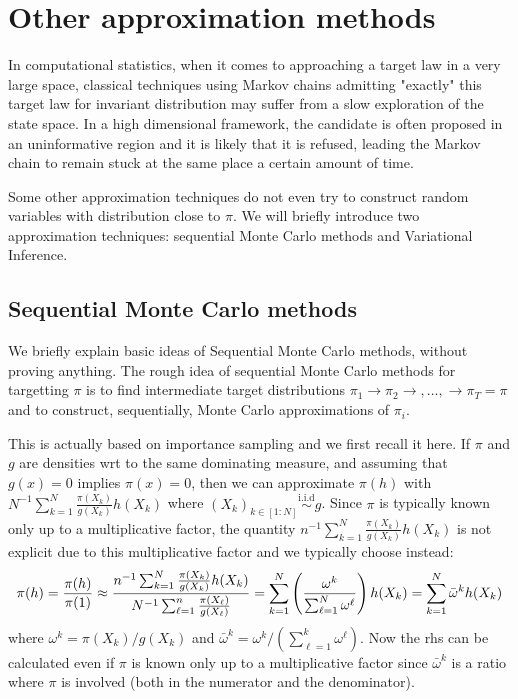 \documentclass[english,graybox,envcountchap,envcountsame,sectrefs,shortlabels]{svmono}
\theoremstyle{style}
\newcommand{\iid}{\stackrel{\mathrm{i.i.d}}{\sim}}
\begin{document}
\section{Other approximation methods}
In computational statistics, when it comes to approaching a target law in a very large space,
classical techniques using Markov chains admitting "exactly" this target law
for invariant distribution may suffer from a slow exploration of the state space. In a high dimensional framework, the candidate is often proposed in an uninformative region and it is likely that it is refused, leading the Markov chain to remain stuck at the same place a certain amount of time.

Some other approximation techniques do not even try to construct random variables with distribution close to $\pi$. We will briefly introduce two approximation techniques: sequential Monte Carlo methods and Variational Inference.

\subsection{Sequential Monte Carlo methods}
We briefly explain basic ideas of Sequential Monte Carlo methods, without proving anything.
The rough idea of sequential Monte Carlo methods for targetting $\pi$ is to find intermediate target distributions $\pi_1\rightarrow \pi_2\rightarrow,\ldots,\rightarrow \pi_T=\pi$ and to construct, sequentially, Monte Carlo approximations of $\pi_i$.




This is actually based on importance sampling and we first recall it here. If $\pi$ and $g$ are densities wrt to the same dominating measure, and assuming that $g(x)=0$ implies $\pi(x)=0$, then we can approximate $\pi(h)$ with $N^{-1}\sum_{k=1}^N \frac{\pi(X_k)}{g(X_k)} h(X_k)$ where $(X_k)_{k\in[1:N]} \iid g$. Since $\pi$ is typically known only up to a multiplicative factor, the quantity $n^{-1}\sum_{k=1}^N \frac{\pi(X_k)}{g(X_k)} h(X_k)$ is not explicit due to this multiplicative factor and we typically choose instead:
$$
\pi(h) =\frac{\pi(h)}{\pi(1)}\approx \frac{n^{-1}\sum_{k=1}^N \frac{\pi(X_k)}{g(X_k)} h(X_k)}{N^{-1}\sum_{\ell=1}^n \frac{\pi(X_\ell)}{g(X_\ell)}}=\sum_{k=1}^N \left(\frac{ \omega^k}{\sum_{\ell=1}^N \omega^\ell}\right)  h(X_k)=\sum_{k=1}^N \bar\omega^k  h(X_k)
$$
where $\omega^k=\pi(X_k)/g(X_k)$ and $\bar \omega^k=\omega^k/(\sum_{\ell=1}^{k} \omega^\ell)$. Now the rhs can be calculated even if $\pi$ is known only up to a multiplicative factor since $\bar \omega^k$ is a ratio where $\pi$ is involved (both in the numerator and the denominator).
\end{document}
